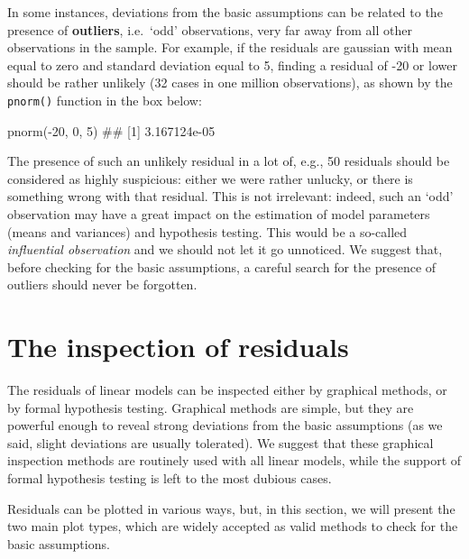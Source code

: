 \documentclass[a4paper,12pt,oneside]{book}
\newenvironment{Shaded}{\begin{snugshade}}{\end{snugshade}}
\newcommand{\DecValTok}[1]{#1}
\newcommand{\SpecialCharTok}[1]{#1}
\newcommand{\DocumentationTok}[1]{#1}
\newcommand{\FunctionTok}[1]{#1}
\newcommand{\NormalTok}[1]{#1}
\begin{document}
In some instances, deviations from the basic assumptions can be related to the presence of \textbf{outliers}, i.e.~`odd' observations, very far away from all other observations in the sample. For example, if the residuals are gaussian with mean equal to zero and standard deviation equal to 5, finding a residual of -20 or lower should be rather unlikely (32 cases in one million observations), as shown by the \texttt{pnorm()} function in the box below:

\begin{Shaded}
\begin{Highlighting}[]
\FunctionTok{pnorm}\NormalTok{(}\SpecialCharTok{{-}}\DecValTok{20}\NormalTok{, }\DecValTok{0}\NormalTok{, }\DecValTok{5}\NormalTok{)}
\DocumentationTok{\#\# [1] 3.167124e{-}05}
\end{Highlighting}
\end{Shaded}

The presence of such an unlikely residual in a lot of, e.g., 50 residuals should be considered as highly suspicious: either we were rather unlucky, or there is something wrong with that residual. This is not irrelevant: indeed, such an `odd' observation may have a great impact on the estimation of model parameters (means and variances) and hypothesis testing. This would be a so-called \emph{influential observation} and we should not let it go unnoticed. We suggest that, before checking for the basic assumptions, a careful search for the presence of outliers should never be forgotten.

\hypertarget{the-inspection-of-residuals}{%
\section{The inspection of residuals}\label{the-inspection-of-residuals}}

The residuals of linear models can be inspected either by graphical methods, or by formal hypothesis testing. Graphical methods are simple, but they are powerful enough to reveal strong deviations from the basic assumptions (as we said, slight deviations are usually tolerated). We suggest that these graphical inspection methods are routinely used with all linear models, while the support of formal hypothesis testing is left to the most dubious cases.

Residuals can be plotted in various ways, but, in this section, we will present the two main plot types, which are widely accepted as valid methods to check for the basic assumptions.
\end{document}
